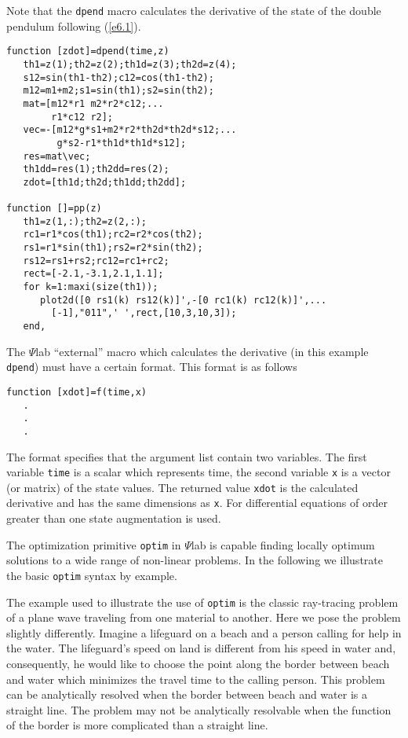 

Note that the {\tt dpend} macro calculates the derivative of
the state of the double pendulum following (\ref{e6.1}).

\begin{verbatim}
function [zdot]=dpend(time,z)
   th1=z(1);th2=z(2);th1d=z(3);th2d=z(4);
   s12=sin(th1-th2);c12=cos(th1-th2);
   m12=m1+m2;s1=sin(th1);s2=sin(th2);
   mat=[m12*r1 m2*r2*c12;...
        r1*c12 r2];
   vec=-[m12*g*s1+m2*r2*th2d*th2d*s12;...
         g*s2-r1*th1d*th1d*s12];
   res=mat\vec;
   th1dd=res(1);th2dd=res(2);
   zdot=[th1d;th2d;th1dd;th2dd];

function []=pp(z)
   th1=z(1,:);th2=z(2,:);
   rc1=r1*cos(th1);rc2=r2*cos(th2);
   rs1=r1*sin(th1);rs2=r2*sin(th2);
   rs12=rs1+rs2;rc12=rc1+rc2;
   rect=[-2.1,-3.1,2.1,1.1];
   for k=1:maxi(size(th1));
      plot2d([0 rs1(k) rs12(k)]',-[0 rc1(k) rc12(k)]',...
		[-1],"011",' ',rect,[10,3,10,3]);
   end,

\end{verbatim}

	The $\Psi$lab ``external'' macro which calculates the derivative
(in this example {\tt dpend}) must have a certain format.
This format is as follows
\begin{verbatim}
function [xdot]=f(time,x)
   .
   .
   .
\end{verbatim}
The format specifies that the argument list contain two variables.
The first variable {\tt time} is a scalar which represents time, the second
variable {\tt x} is a vector (or matrix) of the state values.  The returned
value {\tt xdot} is the calculated derivative and has the same dimensions
as {\tt x}.  For differential equations of order greater than one
state augmentation is used. 

The optimization primitive 
{\tt optim} in $\Psi$lab
is capable finding locally optimum solutions to a wide range
of non-linear problems.  In the following we illustrate 
the basic {\tt optim} syntax by example. 

	The example used to illustrate the use of {\tt optim} is
the classic ray-tracing problem of a plane wave traveling from
one material to another.  Here we pose the problem slightly differently.
Imagine a lifeguard on a beach and a person calling for help 
in the water.  The lifeguard's speed on land is different from
his speed in water and, consequently, he would like to choose the
point along the border between beach and water which minimizes
the travel time to the calling person.  This problem can be analytically
resolved when the border between beach and water is a straight
line.  The problem may not be analytically resolvable when the function
of the border is more complicated than a straight line.

